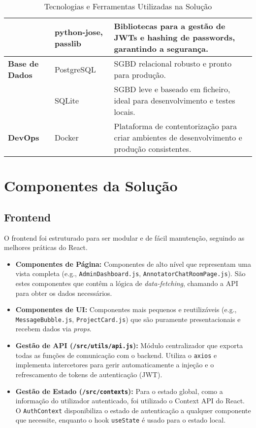 \begin{table}[h!]
\begin{tabular}{|l|l|p{}|}
        & python-jose, passlib & Bibliotecas para a gestão de JWTs e hashing de passwords, garantindo a segurança. \\
        \hline
        \textbf{Base de Dados} & PostgreSQL & SGBD relacional robusto e pronto para produção. \\
        & SQLite & SGBD leve e baseado em ficheiro, ideal para desenvolvimento e testes locais. \\
        \hline
        \textbf{DevOps} & Docker & Plataforma de contentorização para criar ambientes de desenvolvimento e produção consistentes. \\
        \hline
    \end{tabular}
    \caption{Tecnologias e Ferramentas Utilizadas na Solução}
    \label{tab:tecnologias_utilizadas}
\end{table}

\section{Componentes da Solução}

\subsection{Frontend}

O frontend foi estruturado para ser modular e de fácil manutenção, seguindo as melhores práticas do React.

\begin{itemize}
    \item \textbf{Componentes de Página:} Componentes de alto nível que representam uma vista completa (e.g., \texttt{AdminDashboard.js}, \texttt{AnnotatorChatRoomPage.js}). São estes componentes que contêm a lógica de \textit{data-fetching}, chamando a API para obter os dados necessários.
    \item \textbf{Componentes de UI:} Componentes mais pequenos e reutilizáveis (e.g., \texttt{MessageBubble.js}, \texttt{ProjectCard.js}) que são puramente presentacionais e recebem dados via \textit{props}.
    \item \textbf{Gestão de API (\texttt{/src/utils/api.js}):} Módulo centralizador que exporta todas as funções de comunicação com o backend. Utiliza o \texttt{axios} e implementa intercetores para gerir automaticamente a injeção e o refrescamento de tokens de autenticação (JWT).
    \item \textbf{Gestão de Estado (\texttt{/src/contexts}):} Para o estado global, como a informação do utilizador autenticado, foi utilizado o Context API do React. O \texttt{AuthContext} disponibiliza o estado de autenticação a qualquer componente que necessite, enquanto o hook \texttt{useState} é usado para o estado local.
\end{itemize}

